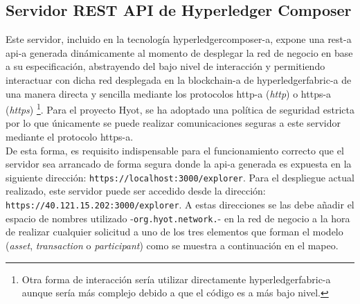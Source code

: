 \documentclass[12pt,a4paper, twoside]{report}
\begin{document}
	\subsection{Servidor REST API de Hyperledger Composer}
	
	Este servidor, incluido en la tecnología \gls{hyperledgercomposer-a}, expone una \gls{rest-a} \gls{api-a} generada dinámicamente al momento de desplegar la red de negocio en base a su especificación, abstrayendo del bajo nivel de interacción y permitiendo interactuar con dicha red desplegada en la \gls{blockchain-a} de \gls{hyperledgerfabric-a} de una manera directa y sencilla mediante los protocolos \gls{http-a} (\textit{\gls{http}}) o \gls{https-a} (\textit{\gls{https}}) \footnote{Otra forma de interacción sería utilizar directamente \gls{hyperledgerfabric-a} aunque sería más complejo debido a que el código es a más bajo nivel.}. Para el proyecto Hyot, se ha adoptado una política de seguridad estricta por lo que únicamente se puede realizar comunicaciones seguras a este servidor mediante el protocolo \gls{https-a}. \\
	
	De esta forma, es requisito indispensable para el funcionamiento correcto que el servidor sea arrancado de forma segura donde la \gls{api-a} generada es expuesta en la siguiente dirección: \texttt{https://localhost:3000/explorer}. Para el despliegue actual realizado, este servidor puede ser accedido desde la dirección: \texttt{https://40.121.15.202:3000/explorer}. A estas direcciones se las debe añadir el espacio de nombres utilizado -\texttt{org.hyot.network.}- en la red de negocio a la hora de realizar cualquier solicitud a uno de los tres elementos que forman el modelo (\textit{\gls{asset}}, \textit{\gls{transaction}} o \textit{\gls{participant}}) como se muestra a continuación en el mapeo. \\
	 
\end{document}
